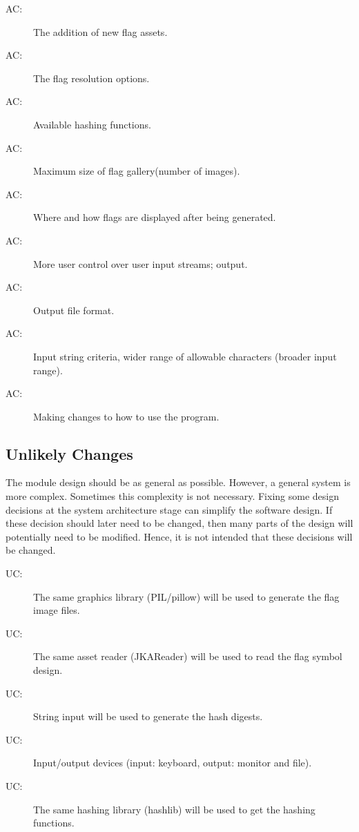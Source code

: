 \documentclass[12pt, titlepage]{article}
\newcounter{acnum}
\newcommand{\actheacnum}{AC\theacnum}
\newcounter{ucnum}
\newcommand{\uctheucnum}{UC\theucnum}
\begin{document}
\begin{description}
\item[ \actheacnum \label{ac1}:] The addition of new
  flag assets.
\item[ \actheacnum \label{ac2}:] The flag resolution
  options.
\item[ \actheacnum \label{ac3}:] Available hashing
  functions.
\item[ \actheacnum \label{ac4}:] Maximum size of flag
  gallery(number of images).
\item[ \actheacnum \label{ac5}:] Where and how flags are
  displayed after being generated.
\item[ \actheacnum \label{ac6}:] More user control over
  user input streams; output.
\item[ \actheacnum \label{ac7}:] Output file format.
\item[ \actheacnum \label{ac8}:] Input string criteria,
  wider range of allowable characters (broader input range).
\item[ \actheacnum \label{ac9}:] Making changes to how
  to use the program.
\end{description}

\subsection{Unlikely Changes} \label{SecUchange}
The module design should be as general as possible. However, a general system
is more complex. Sometimes this complexity is not necessary. Fixing some
design decisions at the system architecture stage can simplify the software
design. If these decision should later need to be changed, then many parts of
the design will potentially need to be modified. Hence, it is not intended
that these decisions will be changed.

\begin{description}
\item[ \uctheucnum \label{uc1}:] The same graphics
  library (PIL/pillow) will be used to generate the flag image files.
\item[ \uctheucnum \label{uc2}:] The same asset reader
  (JKAReader) will be used to read the flag symbol design.
\item[ \uctheucnum \label{uc3}:] String input will be
  used to generate the hash digests.
\item[ \uctheucnum \label{uc4}:] Input/output devices
  (input: keyboard, output: monitor and file).
\item[ \uctheucnum \label{uc5}:] The same hashing
  library (hashlib) will be used to get the hashing functions.
\end{description}
\end{document}
